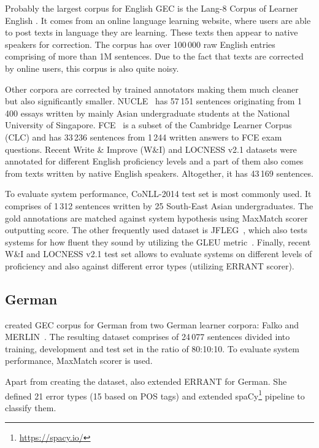 \documentclass[11pt,a4paper]{article}
\begin{document}
Probably the largest corpus for English GEC is the Lang-8 Corpus of Learner English \citep{mizumoto2011mining, tajiri2012tense}. It comes from an online language learning website, where users are able to post texts in language they are learning. These texts then appear to native speakers for correction. The corpus has over 100\,000 raw English entries comprising of more than 1M sentences. Due to the fact that texts are corrected by online users, this corpus is also quite noisy.

Other corpora are corrected by trained annotators making them much cleaner but also significantly smaller. NUCLE~\cite{dahlmeier2013building} has 57\,151 sentences originating from 1\,400 essays written by mainly Asian undergraduate students at the National University of Singapore. FCE~\cite{yannakoudakis2011new} is a subset of the Cambridge Learner
Corpus (CLC) and has 33\,236 sentences from 1\,244 written answers to FCE exam questions. Recent Write \& Improve (W\&I) and LOCNESS v2.1 \citep{bryant2019bea, granger1998} datasets were annotated for different English proficiency levels and a part of them also comes from texts written by native English speakers. Altogether, it has 43\,169 sentences.

To evaluate system performance, CoNLL-2014 test set is most commonly used. It comprises of 1\,312 sentences written by 25 South-East Asian undergraduates. The gold annotations are matched against system hypothesis using MaxMatch scorer outputting  score. The other frequently used dataset is JFLEG~\cite{napoles-sakaguchi-tetreault:2017:EACLshort, heilman-EtAl:2014:P14-2}, which also tests systems for how fluent they sound by utilizing the GLEU metric~\cite{napoles2015ground}. Finally, recent W\&I and LOCNESS v2.1 test set allows to evaluate systems on different levels of proficiency and also against different error types (utilizing ERRANT scorer).

\subsection{German}

 created GEC corpus for German from two German learner corpora: Falko and MERLIN~\cite{boyd2014merlin}. The resulting dataset comprises of 24\,077 sentences divided into training, development and test set in the ratio of 80:10:10. To evaluate system performance, MaxMatch scorer is used.

Apart from creating the dataset,  also extended ERRANT for German. She defined 21 error types (15 based on POS tags) and extended spaCy\footnote{\scriptsize\url{https://spacy.io/}} pipeline to classify them.
\end{document}
